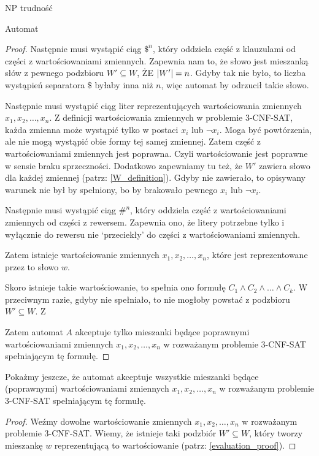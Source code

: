 \documentclass{article}
\theoremstyle{definition}
\theoremstyle{remark}
\begin{document}
\begin{section}{NP trudność}
\begin{subsection}{Automat}
\begin{proof}
         Następnie musi wystąpić ciąg $ \$^n $, który oddziela część z klauzulami od
         części z wartościowaniami zmiennych. Zapewnia nam to, że słowo jest mieszanką
         słów z pewnego podzbioru $W' \subseteq W$, ŻE $ \abs{W'} = n $. Gdyby tak nie
         było, to liczba wystąpień separatora $ \$ $ byłaby inna niż $n$, więc automat
         by odrzucił takie słowo.

         Następnie musi wystąpić ciąg liter reprezentujących wartościowania zmiennych
         $x_1, x_2, \ldots, x_n$. Z definicji wartościowania zmiennych w problemie
         3-CNF-SAT, każda zmienna może wystąpić tylko w postaci $x_i$ lub $\neg x_i$.
         Moga być powtórzenia, ale nie mogą wystąpić obie formy tej samej zmiennej.
         Zatem część z wartościowaniami zmiennych jest poprawna. Czyli wartościowanie
         jest poprawne w sensie braku sprzeczności. Dodatkowo zapewniamy tu też, że $W'$
         zawiera słowo dla każdej zmiennej (patrz: \ref{W_definition}). Gdyby nie
         zawierało, to opisywany warunek nie był by spełniony, bo by brakowało pewnego
         $x_i$ lub $\neg x_i$.

         Następnie musi wystąpić ciąg $ \#^n $, który oddziela część z wartościowaniami
         zmiennych od części z rewersem. Zapewnia ono, że litery potrzebne tylko i
         wyłącznie do rewersu nie `przeciekły' do części z wartościowaniami zmiennych.

         Zatem istnieje wartościowanie zmiennych $x_1, x_2, \ldots, x_n$, które jest
         reprezentowane przez to słowo $w$.

         Skoro istnieje takie wartościowanie, to spełnia ono formułę $C_1 \land C_2
             \land \ldots \land C_k$. W przeciwnym razie, gdyby nie spełniało, to nie
         mogłoby powstać z podzbioru $W' \subseteq W$. Z

         Zatem automat $A$ akceptuje tylko mieszanki będące poprawnymi wartościowaniami
         zmiennych $x_1, x_2, \ldots, x_n$ w rozważanym problemie 3-CNF-SAT spełniającym
         tę formułę.
     \end{proof}

     Pokażmy jeszcze, że automat akceptuje wszystkie mieszanki będące (poprawnymi)
     wartościowaniami zmiennych $x_1, x_2, \ldots, x_n$ w rozważanym problemie
     3-CNF-SAT spełniającym tę formułę.

     \begin{proof}
         Weźmy dowolne wartościowanie zmiennych $x_1, x_2, \ldots, x_n$ w rozważanym problemie 3-CNF-SAT.
         Wiemy, że istnieje taki podzbiór $W' \subseteq W$, który tworzy mieszankę $w$ reprezentującą to wartościowanie (patrz: \ref{evaluation_proof}).


\end{proof}
\end{subsection}
\end{section}
\end{document}
